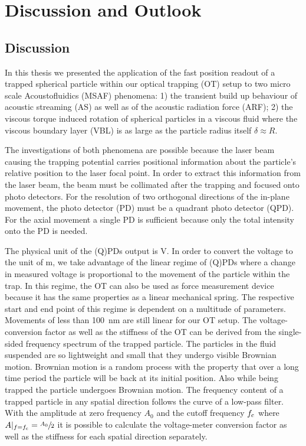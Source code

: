 \chapter[Discussion \& Outlook]{Discussion and Outlook}\label{ch:discussion}

\section{Discussion}
In this thesis we presented the application of the fast position readout of a 
trapped spherical particle within our optical trapping (OT) setup to two micro 
scale Acoustofluidics (MSAF) phenomena: 1) the transient build up behaviour of 
acoustic streaming (AS) as well as of the acoustic radiation force (ARF); 2) 
the viscous torque induced rotation of spherical particles in a viscous fluid 
where the viscous boundary layer (VBL) is as large as the particle radius 
itself $\delta \approx R$.

The investigations of both phenomena are possible because the laser beam 
causing the trapping potential carries positional information about the 
particle's relative position to the laser focal point. In order to extract this 
information from the laser beam, the beam must be collimated after the trapping 
and focused onto photo detectors. For the resolution of two orthogonal 
directions of the in-plane movement, the photo detector (PD) must be a quadrant 
photo detector (QPD). For the axial movement a single PD is sufficient because 
only the total intensity onto the PD is needed.

The physical unit of the (Q)PDs output is \si{\volt}. In order to convert the 
voltage to the unit of \si{\meter}, we take advantage of the linear regime of 
(Q)PDs where a change in measured voltage is proportional to the movement of 
the particle within the trap. In this regime, the OT can also be used as force 
measurement device because it has the same properties as a linear mechanical 
spring. The respective start and end point of this regime is dependent on a 
multitude of parameters. Movements of less than \SI{100}{\nm} are still linear 
for our OT setup. The voltage-conversion factor as well as the stiffness of the 
OT can be derived from the single-sided frequency spectrum of the trapped 
particle. The particles in the fluid suspended are so lightweight and small 
that they undergo visible Brownian motion. Brownian motion is a random process 
with the property that over a long time period the particle will be back at its 
initial position. Also while being trapped the particle undergoes Brownian 
motion. The frequency content of a trapped particle in any spatial direction 
follows the curve of a low-pass filter. With the amplitude at zero frequency 
$A_{0}$ and the cutoff frequency $f_{\mathrm{c}}$ where 
$A\vert_{f=f_{\mathrm{c}}}=\sfrac{A_{0}}{2}$ it is possible to calculate the 
voltage-meter conversion factor as well as the stiffness for each spatial 
direction separately.

